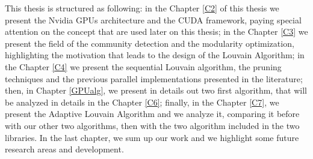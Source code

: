 This thesis is structured as following:
in the Chapter \ref{C2} of this thesis we present the Nvidia GPUs architecture and the CUDA framework, paying special attention on the concept that are used later on this thesis; in the Chapter \ref{C3} we present the field of the community detection and the modularity optimization, highlighting the motivation that leads to the design of the Louvain Algorithm; in the Chapter \ref{C4} we present the sequential Louvain algorithm, the pruning techniques and the previous parallel implementations presented in the literature;
then, in Chapter \ref{GPUalg}, we present in details out two first algorithm, that will be analyzed in details in the Chapter \ref{C6}; finally, in the Chapter \ref{C7}, we present the Adaptive Louvain Algorithm and we analyze it, comparing it before with our other two algorithms, then with the two algorithm included in the two libraries. In the last chapter, we sum up our work and we highlight some future research areas and development. 